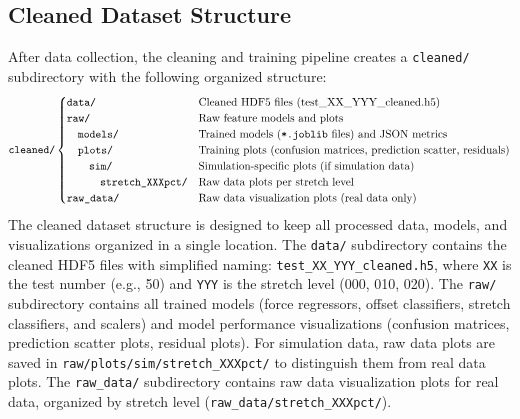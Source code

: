 \documentclass[11pt,a4paper]{article}
\begin{document}
\subsection{Cleaned Dataset Structure}
After data collection, the cleaning and training pipeline creates a \texttt{cleaned/} subdirectory with the following organized structure:
\[
\texttt{cleaned/}\begin{cases}
    \texttt{data/} & \text{Cleaned HDF5 files (test\_XX\_YYY\_cleaned.h5)}\\
    \texttt{raw/} & \text{Raw feature models and plots}\\
    \quad \texttt{models/} & \text{Trained models (\texttt{*.joblib} files) and JSON metrics}\\
    \quad \texttt{plots/} & \text{Training plots (confusion matrices, prediction scatter, residuals)}\\
    \quad \quad \texttt{sim/} & \text{Simulation-specific plots (if simulation data)}\\
    \quad \quad \quad \texttt{stretch\_XXXpct/} & \text{Raw data plots per stretch level}\\
    \texttt{raw\_data/} & \text{Raw data visualization plots (real data only)}
\end{cases}
\]
The cleaned dataset structure is designed to keep all processed data, models, and visualizations organized in a single location. The \texttt{data/} subdirectory contains the cleaned HDF5 files with simplified naming: \texttt{test\_XX\_YYY\_cleaned.h5}, where \texttt{XX} is the test number (e.g., 50) and \texttt{YYY} is the stretch level (000, 010, 020). The \texttt{raw/} subdirectory contains all trained models (force regressors, offset classifiers, stretch classifiers, and scalers) and model performance visualizations (confusion matrices, prediction scatter plots, residual plots). For simulation data, raw data plots are saved in \texttt{raw/plots/sim/stretch\_XXXpct/} to distinguish them from real data plots. The \texttt{raw\_data/} subdirectory contains raw data visualization plots for real data, organized by stretch level (\texttt{raw\_data/stretch\_XXXpct/}).
\end{document}
